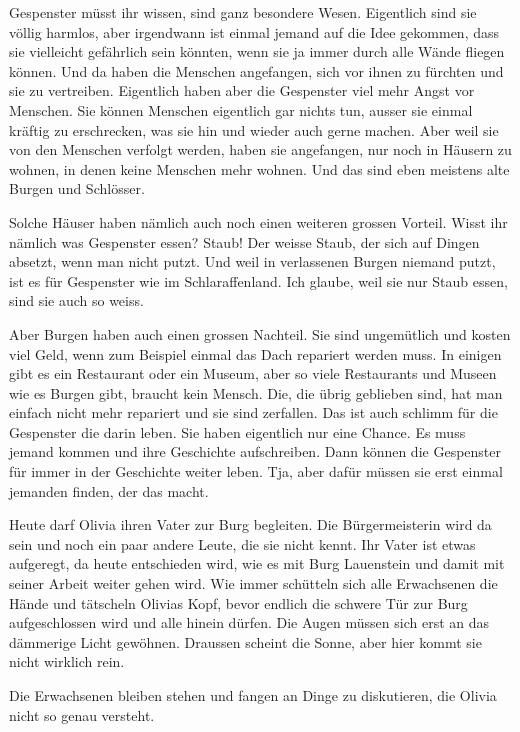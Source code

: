 \begin{mdframed}[style=mystyle]
Gespenster müsst ihr wissen, sind ganz besondere Wesen. Eigentlich sind sie völlig harmlos, aber irgendwann ist einmal jemand auf die Idee gekommen, dass sie vielleicht gefährlich sein könnten, wenn sie ja immer durch alle Wände fliegen können. Und da haben die Menschen angefangen, sich vor ihnen zu fürchten und sie zu vertreiben. Eigentlich haben aber die Gespenster viel mehr Angst vor Menschen. Sie können Menschen eigentlich gar nichts tun, ausser sie einmal kräftig zu erschrecken, was sie hin und wieder auch gerne machen. Aber weil sie von den Menschen verfolgt werden, haben sie angefangen, nur noch in Häusern zu wohnen, in denen keine Menschen mehr wohnen. Und das sind eben meistens alte Burgen und Schlösser.

Solche Häuser haben nämlich auch noch einen weiteren grossen Vorteil. Wisst ihr nämlich was Gespenster essen? Staub! Der weisse Staub, der sich auf Dingen absetzt, wenn man nicht putzt. Und weil in verlassenen Burgen niemand putzt, ist es für Gespenster wie im Schlaraffenland. Ich glaube, weil sie nur Staub essen, sind sie auch so weiss.

Aber Burgen haben auch einen grossen Nachteil. Sie sind ungemütlich und kosten viel Geld, wenn zum Beispiel einmal das Dach repariert werden muss. In einigen gibt es ein Restaurant oder ein Museum, aber so viele Restaurants und Museen wie es Burgen gibt, braucht kein Mensch. Die, die übrig geblieben sind, hat man einfach nicht mehr repariert und sie sind zerfallen. Das ist auch schlimm für die Gespenster die darin leben. Sie haben eigentlich nur eine Chance. Es muss jemand kommen und ihre Geschichte aufschreiben. Dann können die Gespenster für immer in der Geschichte weiter leben. Tja, aber dafür müssen sie erst einmal jemanden finden, der das macht.
\end{mdframed}

Heute darf Olivia ihren Vater zur Burg begleiten. Die Bürgermeisterin wird da sein und noch ein paar andere Leute, die sie nicht kennt. Ihr Vater ist etwas aufgeregt, da heute entschieden wird, wie es mit Burg Lauenstein und damit mit seiner Arbeit weiter gehen wird. Wie immer schütteln sich alle Erwachsenen die Hände und tätscheln Olivias Kopf, bevor endlich die schwere Tür zur Burg aufgeschlossen wird und alle hinein dürfen. Die Augen müssen sich erst an das dämmerige Licht gewöhnen. Draussen scheint die Sonne, aber hier kommt sie nicht wirklich rein.

Die Erwachsenen bleiben stehen und fangen an Dinge zu diskutieren, die Olivia nicht so genau versteht. 

